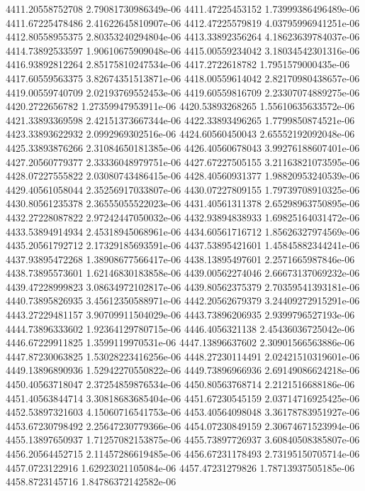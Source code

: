 {4411.20558752708 2.79081730986349e-06
4411.47225453152 1.73999386496489e-06
4411.67225478486 2.41622645810907e-06
4412.47225579819 4.03795996941251e-06
4412.80558955375 2.80353240294804e-06
4413.33892356264 4.18623639784037e-06
4414.73892533597 1.90610675909048e-06
4415.00559234042 3.18034542301316e-06
4416.93892812264 2.85175810247534e-06
4417.2722618782 1.7951579000435e-06
4417.60559563375 3.82674351513871e-06
4418.00559614042 2.82170980438657e-06
4419.00559740709 2.02193769552453e-06
4419.60559816709 2.23307074889275e-06
4420.2722656782 1.27359947953911e-06
4420.53893268265 1.55610635633572e-06
4421.33893369598 2.42151373667344e-06
4422.33893496265 1.7799850874521e-06
4423.33893622932 2.0992969302516e-06
4424.60560450043 2.65552192092048e-06
4425.33893876266 2.31084650181385e-06
4426.40560678043 3.99276188607401e-06
4427.20560779377 2.33336048979751e-06
4427.67227505155 3.21163821073595e-06
4428.07227555822 2.03080743486415e-06
4428.40560931377 1.98820953240539e-06
4429.40561058044 2.35256917033807e-06
4430.07227809155 1.79739708910325e-06
4430.80561235378 2.36555055522023e-06
4431.40561311378 2.65298963750895e-06
4432.27228087822 2.97242447050032e-06
4432.93894838933 1.69825164031472e-06
4433.53894914934 2.45318945068961e-06
4434.60561716712 1.85626327974569e-06
4435.20561792712 2.17329185693591e-06
4437.53895421601 1.45845882344241e-06
4437.93895472268 1.38908677566417e-06
4438.13895497601 2.2571665987846e-06
4438.73895573601 1.62146830183858e-06
4439.00562274046 2.66673137069232e-06
4439.47228999823 3.08634972102817e-06
4439.80562375379 2.70359541393181e-06
4440.73895826935 3.45612350588971e-06
4442.20562679379 3.24409272915291e-06
4443.27229481157 3.90709911504029e-06
4443.73896206935 2.9399796527193e-06
4444.73896333602 1.92364129780715e-06
4446.4056321138 2.45436036725042e-06
4446.67229911825 1.3599119970531e-06
4447.13896637602 2.30901566563886e-06
4447.87230063825 1.53028223416256e-06
4448.27230114491 2.02421510319601e-06
4449.13896890936 1.52942270550822e-06
4449.73896966936 2.69149086624218e-06
4450.40563718047 2.37254859876534e-06
4450.80563768714 2.2121516688186e-06
4451.40563844714 3.30818683685404e-06
4451.67230545159 2.03714716925425e-06
4452.53897321603 4.15060716541753e-06
4453.40564098048 3.36178783951927e-06
4453.67230798492 2.25647230779366e-06
4454.07230849159 2.30674671523994e-06
4455.13897650937 1.71257082153875e-06
4455.73897726937 3.60840508385807e-06
4456.20564452715 2.11457286619485e-06
4456.67231178493 2.73195150705714e-06
4457.0723122916 1.62923021105084e-06
4457.47231279826 1.78713937505185e-06
4458.8723145716 1.84786372142582e-06
}
